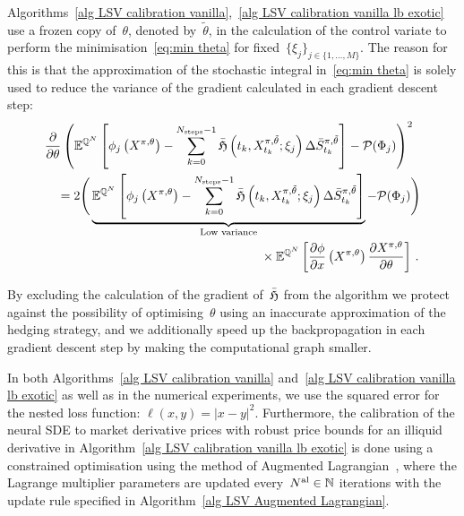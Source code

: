 Algorithms~\ref{alg LSV calibration vanilla},~\ref{alg LSV calibration vanilla lb exotic} use a frozen copy of~$\theta$, denoted by~$\tilde \theta$, in the calculation of the control variate to perform the minimisation~\eqref{eq:min theta} for fixed~$\{\xi_j\}_{j\in\{1,\ldots,M\}}$. The reason for this is that the approximation of the stochastic integral in~\eqref{eq:min theta} is solely used to reduce the variance of the gradient calculated in each gradient descent step:
\begin{align*}
    &\frac{\partial}{\partial \theta}\left( \EE^{\QQ^N}
     \left[\phi_j\left( X^{\pi,\theta} \right) - \sum_{k=0}^{N_{\text{steps}}-1}\bar{\Hf}\left(t_k, X_{t_k}^{\pi,\tilde \theta}; \xi_{j}\right)\Delta \bar{S}^{\pi,\tilde \theta}_{t_{k}} \right]-\Pp(\Phi_j)\right)^2 \\
    & \quad = 2 \Bigg( \underbrace{ \EE^{\QQ^N}
     \left[\phi_j\left( X^{\pi,\theta} \right) - \sum_{k=0}^{N_{\text{steps}}-1}\bar{\Hf}\left(t_k, X_{t_k}^{\pi,\tilde \theta}; \xi_{j}\right)\Delta \bar{S}^{\pi,\tilde \theta}_{t_{k}} \right] }_{\text{Low variance}}-\Pp(\Phi_j)\Bigg) \\
     & \hskip0.5\textwidth  \times \EE^{\QQ^N} \left[\frac{\partial \phi}{\partial x}\left(X^{\pi, \theta}\right)\frac{\partial X^{\pi,\theta}}{\partial \theta}\right] \,.
\end{align*}

By excluding the calculation of the gradient of~$\bar{\mathfrak{H}}$ from the algorithm we protect against the possibility of optimising~$\theta$ using an inaccurate approximation of the hedging strategy, and we additionally speed up the backpropagation in each  gradient descent step by making the computational graph smaller. 


In both Algorithms~\ref{alg LSV calibration vanilla} and~\ref{alg LSV calibration vanilla lb exotic} as well as in the numerical experiments, we use the squared error for the nested loss function:
$\ell(x,y)=\vert x - y \vert^2$.
Furthermore, the calibration of the neural SDE to market derivative prices with robust price bounds for an illiquid derivative in Algorithm~\ref{alg LSV calibration vanilla lb exotic}
is done using a constrained optimisation using the method of Augmented Lagrangian~\cite{Hestenes1969MultiplierMethods}, where the Lagrange multiplier parameters are updated every~$N^\textup{al}\in\mathbb{N}$ iterations with the update rule specified in Algorithm~\ref{alg LSV Augmented Lagrangian}. 


